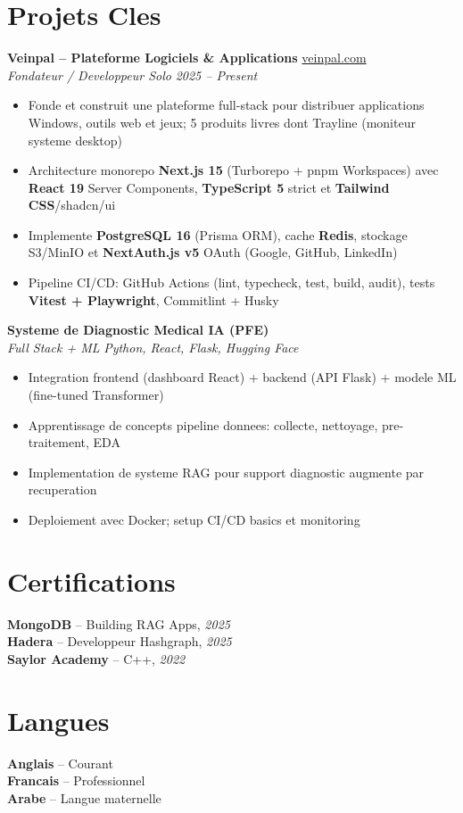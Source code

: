 \documentclass[10pt,a4paper]{article}
\begin{document}
\vspace{4pt}
\section*{Projets Cles}
{\small
\textbf{Veinpal -- Plateforme Logiciels \& Applications} \hfill \href{https://veinpal.com}{veinpal.com}\\[1pt]
\textit{Fondateur / Developpeur Solo} \hfill \textit{2025 -- Present}
\begin{itemize}
  \item Fonde et construit une plateforme full-stack pour distribuer applications Windows, outils web et jeux; 5 produits livres dont Trayline (moniteur systeme desktop)
  \item Architecture monorepo \textbf{Next.js 15} (Turborepo + pnpm Workspaces) avec \textbf{React 19} Server Components, \textbf{TypeScript 5} strict et \textbf{Tailwind CSS}/shadcn/ui
  \item Implemente \textbf{PostgreSQL 16} (Prisma ORM), cache \textbf{Redis}, stockage S3/MinIO et \textbf{NextAuth.js v5} OAuth (Google, GitHub, LinkedIn)
  \item Pipeline CI/CD: GitHub Actions (lint, typecheck, test, build, audit), tests \textbf{Vitest + Playwright}, Commitlint + Husky
\end{itemize}

\vspace{3pt}
\textbf{Systeme de Diagnostic Medical IA (PFE)}\\[1pt]
\textit{Full Stack + ML} \hfill \textit{Python, React, Flask, Hugging Face}
\begin{itemize}
  \item Integration frontend (dashboard React) + backend (API Flask) + modele ML (fine-tuned Transformer)
  \item Apprentissage de concepts pipeline donnees: collecte, nettoyage, pre-traitement, EDA
  \item Implementation de systeme RAG pour support diagnostic augmente par recuperation
  \item Deploiement avec Docker; setup CI/CD basics et monitoring
\end{itemize}
}

\vspace{3pt}
\section*{Certifications}
{\small
\textbf{MongoDB} -- Building RAG Apps, \textit{2025}\\[1pt]
\textbf{Hadera} -- Developpeur Hashgraph, \textit{2025}\\[1pt]
\textbf{Saylor Academy} -- C++, \textit{2022}
}

\section*{Langues}
{\small
\textbf{Anglais} -- Courant\\[1pt]
\textbf{Francais} -- Professionnel\\[1pt]
\textbf{Arabe} -- Langue maternelle
}
\end{document}
